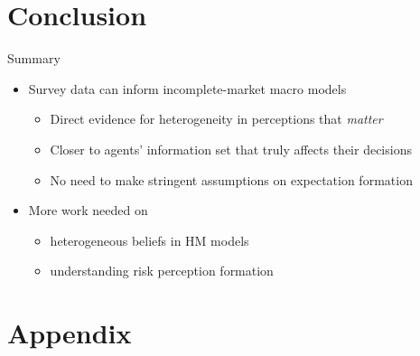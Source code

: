 \documentclass{beamer}
\begin{document}
\section{Conclusion}


\begin{frame}{Summary}
	
	\begin{itemize}
 	\item Survey data can inform incomplete-market macro models 
 	\begin{itemize}
 		\item Direct evidence for heterogeneity in perceptions that \textit{matter}
 		\item Closer to agents' information set that truly affects their decisions
 			\item No need to make stringent assumptions on expectation formation
 	\end{itemize}

	\item More work needed on 
	\begin{itemize}
		\item heterogeneous beliefs in HM models
		\item understanding risk perception formation  
	\end{itemize}
	\end{itemize}
\end{frame}





\section*{Appendix}
\end{document}
